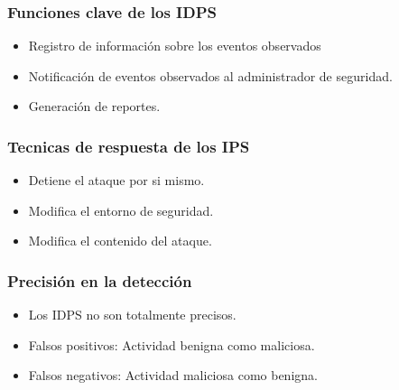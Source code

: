 \documentclass[11pt]{article}
\begin{document}
\subsubsection{Funciones clave de los IDPS}
\label{sec:orgf0a37b3}
\begin{itemize}
\item Registro de información sobre los eventos observados
\item Notificación de eventos observados al administrador de seguridad.
\item Generación de reportes.
\end{itemize}
\subsubsection{Tecnicas de respuesta de los IPS}
\label{sec:org0745aec}
\begin{itemize}
\item Detiene el ataque por si mismo.
\item Modifica el entorno de seguridad.
\item Modifica el contenido del ataque.
\end{itemize}
\subsubsection{Precisión en la detección}
\label{sec:org895dd8c}
\begin{itemize}
\item Los IDPS no son totalmente precisos.
\item Falsos positivos: Actividad benigna como maliciosa.
\item Falsos negativos: Actividad maliciosa como benigna.
\end{itemize}
\end{document}
